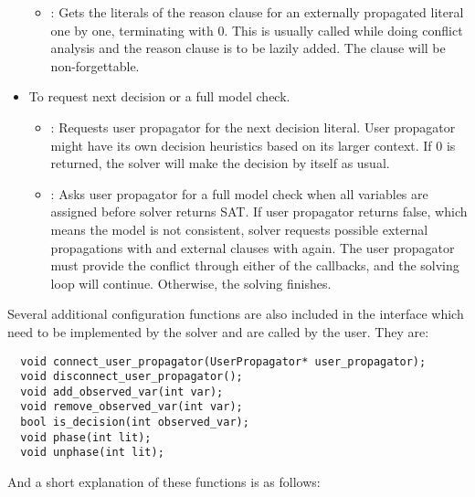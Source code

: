 \begin{itemize}
\begin{itemize}
      \item {}: Gets the literals of the reason clause for an externally propagated literal one by one, terminating with 0. This is usually called while doing conflict analysis and the reason clause is to be lazily added. The clause will be non-forgettable.
    \end{itemize}
  \item To request next decision or a full model check.
    \begin{itemize}
      \item {}: Requests user propagator for the next decision literal. User propagator might have its own decision heuristics based on its larger context. If 0 is returned, the solver will make the decision by itself as usual.
      \item {}: Asks user propagator for a full model check when all variables are assigned before solver returns SAT. If user propagator returns false, which means the model is not consistent, solver requests possible external propagations with  and external clauses with  again. The user propagator must provide the conflict through either of the callbacks, and the solving loop will continue. Otherwise, the solving finishes.
    \end{itemize}
\end{itemize}

Several additional configuration functions are also included in the interface which need to be implemented by the solver and are called by the user. They are:

\begin{lstlisting}
  void connect_user_propagator(UserPropagator* user_propagator);
  void disconnect_user_propagator();
  void add_observed_var(int var);
  void remove_observed_var(int var);
  bool is_decision(int observed_var);
  void phase(int lit);
  void unphase(int lit);
\end{lstlisting}

And a short explanation of these functions is as follows:

